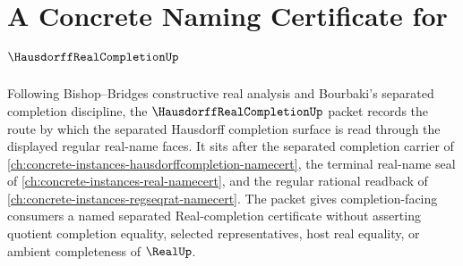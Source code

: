 \chapter{A Concrete Naming Certificate for $\HausdorffRealCompletionUp$}
\label{ch:concrete-instances-hausdorff-real-completion-namecert}

Following Bishop--Bridges constructive real analysis and Bourbaki's separated completion discipline, the $\HausdorffRealCompletionUp$ packet records the route by which the separated Hausdorff completion surface is read through the displayed regular real-name faces. It sits after the separated completion carrier of \autoref{ch:concrete-instances-hausdorffcompletion-namecert}, the terminal real-name seal of \autoref{ch:concrete-instances-real-namecert}, and the regular rational readback of \autoref{ch:concrete-instances-regseqrat-namecert}. The packet gives completion-facing consumers a named separated Real-completion certificate without asserting quotient completion equality, selected representatives, host real equality, or ambient completeness of $\RealUp$.

